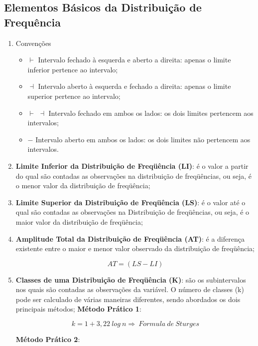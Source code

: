 \newpage


\subsection{Elementos Básicos da Distribuição de Frequência}


\begin{enumerate}
  \item Convenções
  \begin{itemize}
    \item $\vdash$ Intervalo fechado à esquerda e aberto a direita: apenas o limite inferior pertence ao intervalo;
    \item $\dashv$ Intervalo aberto à esquerda e fechado a direita: apenas o limite superior pertence ao intervalo;
    \item $\vdash$ $\dashv$ Intervalo fechado em ambos os lados: os dois limites pertencem aos intervalos;
    \item $-$ Intervalo aberto em ambos os lados: os dois limites não pertencem aos intervalos.
  \end{itemize}
  \item \textbf{Limite Inferior da Distribuição de Freqüência (LI)}: é o valor a partir do qual são contadas as observações na distribuição de freqüências, ou seja, é o menor valor da distribuição de freqüência;
  \item \textbf{Limite Superior da Distribuição de Freqüência (LS)}: é o valor até o qual são contadas as observações na Distribuição de freqüências, ou seja, é o maior valor da distribuição de freqüência;
  \item \textbf{Amplitude Total da Distribuição de Freqüência (AT)}: é a diferença existente entre o maior e menor valor observado da distribuição de freqüência;

     $$ AT= (LS-LI) $$

  \item \textbf{Classes de uma Distribuição de Freqüência (K)}: são os subintervalos nos quais são contadas as observações da variável. O número de classes (k) pode ser calculado de várias maneiras diferentes, sendo abordados os dois principais métodos;\vskip0.3cm
\textbf{Método Prático 1}:

$$ k= 1+3,22 \ log \ n \Rightarrow \ Formula \ de \ Sturges $$

\textbf{Método Prático 2}: \vskip0.3cm


\end{enumerate}
